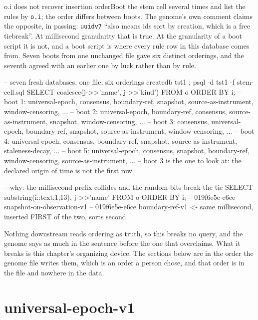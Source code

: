 \begin{Correspondence}{o.i does not recover insertion order}{Boot the stem cell several times and list the rules by \texttt{o.i}; the order differs between boots.}
The genome's own comment claims the opposite, in passing: \texttt{uuidv7} ``also means ids sort by creation, which is a free tiebreak''. At millisecond granularity that is true. At the granularity of a boot script it is not, and a boot script is where every rule row in this database comes from. Seven boots from one unchanged file gave six distinct orderings, and the seventh agreed with an earlier one by luck rather than by rule.
\begin{Check}
-- seven fresh databases, one file, six orderings
createdb tst1 ; psql -d tst1 -f stem-cell.sql
SELECT coalesce(j->>'name', j->>'kind') FROM o ORDER BY i;
-- boot 1: universal-epoch, consensus, boundary-ref, snapshot, source-as-instrument, window-censoring, ...
-- boot 2: universal-epoch, boundary-ref, consensus, source-as-instrument, snapshot, window-censoring, ...
-- boot 3: consensus, universal-epoch, boundary-ref, snapshot, source-as-instrument, window-censoring, ...
-- boot 4: universal-epoch, consensus, boundary-ref, snapshot, source-as-instrument, staleness-decay, ...
-- boot 5: universal-epoch, consensus, snapshot, boundary-ref, window-censoring, source-as-instrument, ...
-- boot 3 is the one to look at: the declared origin of time is not the first row

-- why: the millisecond prefix collides and the random bits break the tie
SELECT substring(i::text,1,13), j->>'name' FROM o ORDER BY i;
-- 019f6e5e-e6ce  snapshot-on-observation-v1
-- 019f6e5e-e6ce  boundary-ref-v1   <- same millisecond, inserted FIRST of the two, sorts second
\end{Check}
Nothing downstream reads ordering as truth, so this breaks no query, and the genome says as much in the sentence before the one that overclaims. What it breaks is this chapter's organizing device. The sections below are in the order the genome file writes them, which is an order a person chose, and that order is in the file and nowhere in the data.
\end{Correspondence}

\section{universal-epoch-v1}

